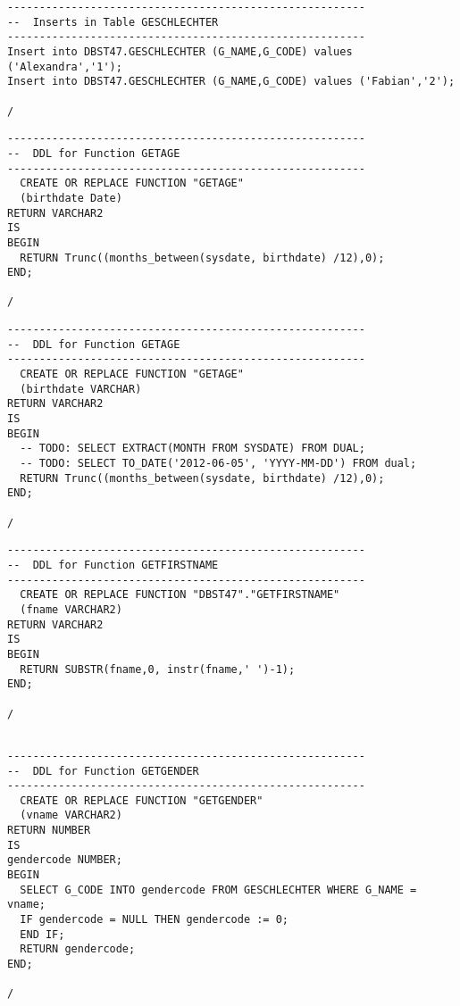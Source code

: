\documentclass{scrartcl}
\begin{document}
\begin{lstlisting}
--------------------------------------------------------
--  Inserts in Table GESCHLECHTER
--------------------------------------------------------
Insert into DBST47.GESCHLECHTER (G_NAME,G_CODE) values ('Alexandra','1');
Insert into DBST47.GESCHLECHTER (G_NAME,G_CODE) values ('Fabian','2');

/
\end{lstlisting}

\begin{lstlisting}
--------------------------------------------------------
--  DDL for Function GETAGE
--------------------------------------------------------
  CREATE OR REPLACE FUNCTION "GETAGE" 
  (birthdate Date)
RETURN VARCHAR2
IS
BEGIN
  RETURN Trunc((months_between(sysdate, birthdate) /12),0);
END;

/
\end{lstlisting}

\begin{lstlisting}
--------------------------------------------------------
--  DDL for Function GETAGE
--------------------------------------------------------
  CREATE OR REPLACE FUNCTION "GETAGE" 
  (birthdate VARCHAR)
RETURN VARCHAR2
IS
BEGIN
  -- TODO: SELECT EXTRACT(MONTH FROM SYSDATE) FROM DUAL;
  -- TODO: SELECT TO_DATE('2012-06-05', 'YYYY-MM-DD') FROM dual;
  RETURN Trunc((months_between(sysdate, birthdate) /12),0);
END;

/
\end{lstlisting}

\begin{lstlisting}
--------------------------------------------------------
--  DDL for Function GETFIRSTNAME
--------------------------------------------------------
  CREATE OR REPLACE FUNCTION "DBST47"."GETFIRSTNAME" 
  (fname VARCHAR2)
RETURN VARCHAR2
IS
BEGIN
  RETURN SUBSTR(fname,0, instr(fname,' ')-1);
END;

/
\end{lstlisting}

\begin{lstlisting}

--------------------------------------------------------
--  DDL for Function GETGENDER
--------------------------------------------------------
  CREATE OR REPLACE FUNCTION "GETGENDER" 
  (vname VARCHAR2)
RETURN NUMBER
IS
gendercode NUMBER;
BEGIN
  SELECT G_CODE INTO gendercode FROM GESCHLECHTER WHERE G_NAME = vname;
  IF gendercode = NULL THEN gendercode := 0; 
  END IF;
  RETURN gendercode;
END;

/
\end{lstlisting}
\end{document}
